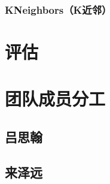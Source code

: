 \documentclass[fontset=windows]{ctexart}
\begin{document}
\subsubsection{KNeighbors（K近邻）}







\section{评估}

\section{团队成员分工}

\subsection{吕思翰}

\subsection{来泽远}
\end{document}
